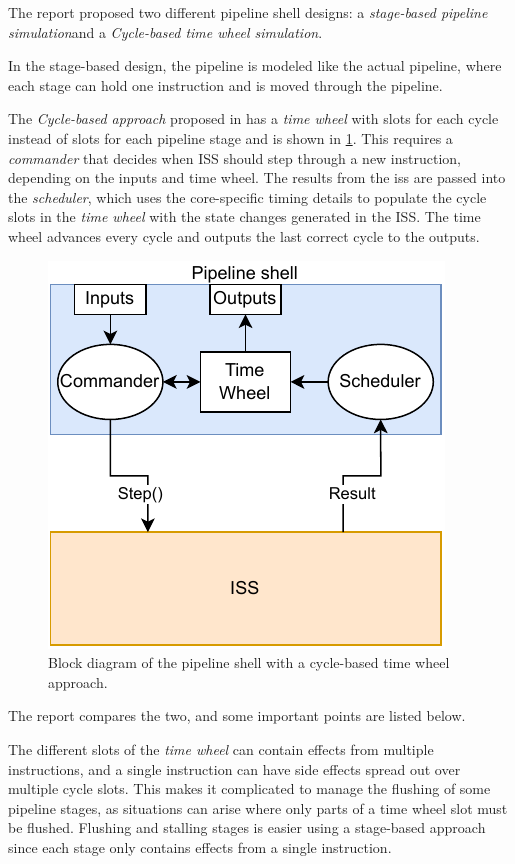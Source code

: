 The report proposed two different pipeline shell designs: a \textit{stage-based pipeline simulation}and a \textit{Cycle-based time wheel simulation}. 

In the stage-based design, the pipeline is modeled like the actual pipeline, where each stage can hold one instruction and is moved through the pipeline.

The \textit{Cycle-based approach} proposed in \cite{chiangEfficientTwolayeredCycleaccurate2009} has a \textit{time wheel} with slots for each cycle instead of slots for each pipeline stage and is shown in \cref{fig:time wheel block}. This requires a \textit{commander} that decides when ISS should step through a new instruction, depending on the inputs and time wheel. The results from the \acrshort{iss} are passed into the \textit{scheduler}, which uses the core-specific timing details to populate the cycle slots in the \textit{time wheel} with the state changes generated in the ISS. The time wheel advances every cycle and outputs the last correct cycle to the outputs.

\begin{figure}[htb]
    \centering
    \includegraphics[width=0.5\linewidth]{prosjektoppgave/time-wheel.pdf}
    \caption{Block diagram of the pipeline shell with a cycle-based time wheel approach.}
    \label{fig:time wheel block}
\end{figure}

The report compares the two, and some important points are listed below.

The different slots of the \textit{time wheel} can contain effects from multiple instructions, and a single instruction can have side effects spread out over multiple cycle slots. This makes it complicated to manage the flushing of some pipeline stages, as situations can arise where only parts of a time wheel slot must be flushed. Flushing and stalling stages is easier using a stage-based approach since each stage only contains effects from a single instruction.


